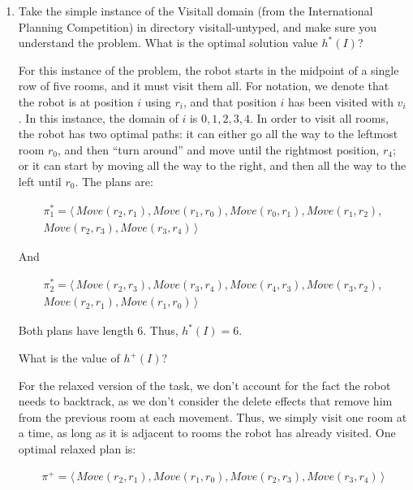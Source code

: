 \documentclass[11pt]{article}
\begin{document}
\begin{titlepage}
\begin{enumerate}[label=(\alph*)]
\begin{enumerate}[label=(\roman*)]
\end{enumerate}

\item Take the simple instance of the Visitall domain (from the International Planning Competition)
in directory visitall-untyped, and make sure you understand the problem.
What is the optimal solution value $h^{*}(I)$? \par
\vspace{5mm}

For this instance of the problem, the robot starts in the midpoint of a single row of five
rooms, and it must visit them all. For notation, we denote that the robot is at position $i$ using
$r_i$, and that position $i$ has been visited with $v_i$. In this instance, the domain of $i$ is
${0, 1, 2, 3, 4}$. In order to visit all rooms, the robot
has two optimal paths: it can either go all the way to the leftmost room $r_0$,
and then ``turn around'' and move until the rightmost position, $r_4$; or it can start by moving all the
way to the right, and then all the way to the left until $r_0$. The plans are:

\begin{align*}
\pi_1^{*} = \langle \, Move(r_2, r_1), Move(r_1, r_0), Move(r_0, r_1), Move(r_1, r_2), \\
Move(r_2, r_3), Move(r_3, r_4) \, \rangle
\end{align*}

And

\begin{align*}
\pi_2^{*} = \langle \, Move(r_2, r_3), Move(r_3, r_4), Move(r_4, r_3), Move(r_3, r_2), \\
Move(r_2, r_1), Move(r_1, r_0) \, \rangle
\end{align*}

Both plans have length 6. Thus, $h^{*}(I) = 6$. \par
\vspace{5mm}

What is the value of $h^{+}(I)$?\par
\vspace{5mm}
For the relaxed version of the task, we don't account for the fact the robot needs to backtrack,
as we don't consider the delete effects that remove him from the previous room at each movement.
Thus, we simply visit one room at a time, as long as it is adjacent to rooms the robot has already
visited. One optimal relaxed plan is:

\begin{align*}
    \pi^{+} = \langle \, Move(r_2, r_1), Move(r_1, r_0), Move(r_2, r_3), Move(r_3, r_4) \, \rangle
\end{align*}


\end{enumerate}
\end{titlepage}
\end{document}
